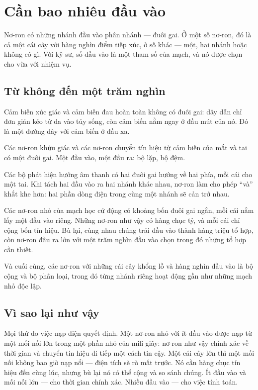 \chapter{Cần bao nhiêu đầu vào}

Nơ-ron có những nhánh đầu vào phân nhánh --- đuôi gai. Ở một số nơ-ron, đó là cả một cái cây với hàng nghìn điểm tiếp xúc, ở số khác --- một, hai nhánh hoặc không có gì. Với kỹ sư, số đầu vào là một tham số của mạch, và nó được chọn cho vừa với nhiệm vụ.

\section*{Từ không đến một trăm nghìn}

Cảm biến xúc giác và cảm biến đau hoàn toàn không có đuôi gai: dây dẫn chỉ đơn giản kéo từ da vào tủy sống, còn cảm biến nằm ngay ở đầu mút của nó. Đó là một đường dây với cảm biến ở đầu xa.


Các nơ-ron khứu giác và các nơ-ron chuyển tín hiệu từ cảm biến của mắt và tai có một đuôi gai. Một đầu vào, một đầu ra: bộ lặp, bộ đệm.

Các bộ phát hiện hướng âm thanh có hai đuôi gai hướng về hai phía, mỗi cái cho một tai. Khi tách hai đầu vào ra hai nhánh khác nhau, nơ-ron làm cho phép ``và'' khắt khe hơn: hai phần dòng điện trong cùng một nhánh sẽ cản trở nhau.

Các nơ-ron nhỏ của mạch học cử động có khoảng bốn đuôi gai ngắn, mỗi cái nắm lấy một đầu vào riêng. Những nơ-ron như vậy có hàng chục tỷ, và mỗi cái chỉ cộng bốn tín hiệu. Bù lại, cùng nhau chúng trải đầu vào thành hàng triệu tổ hợp, còn nơ-ron đầu ra lớn với một trăm nghìn đầu vào chọn trong đó những tổ hợp cần thiết.

Và cuối cùng, các nơ-ron với những cái cây khổng lồ và hàng nghìn đầu vào là bộ cộng và bộ phân loại, trong đó từng nhánh riêng hoạt động gần như những mạch nhỏ độc lập.

\section*{Vì sao lại như vậy}

Mọi thứ do việc nạp điện quyết định. Một nơ-ron nhỏ với ít đầu vào được nạp từ một mối nối lớn trong một phần nhỏ của mili giây: nơ-ron như vậy chính xác về thời gian và chuyển tín hiệu đi tiếp một cách tin cậy. Một cái cây lớn thì một mối nối không bao giờ nạp nổi --- điện tích sẽ rò mất trước. Nó cần hàng chục tín hiệu đến cùng lúc, nhưng bù lại nó có thể cộng và so sánh chúng. Ít đầu vào và mối nối lớn --- cho thời gian chính xác. Nhiều đầu vào --- cho việc tính toán.

